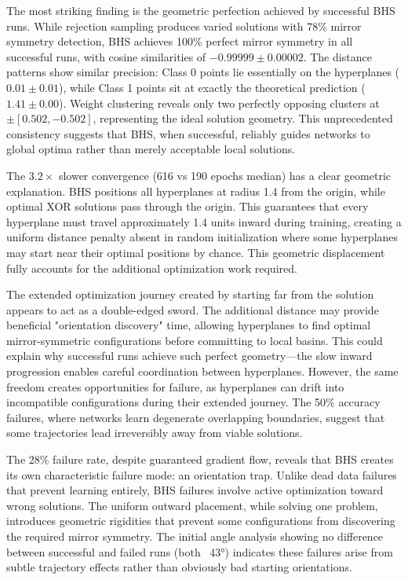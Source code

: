The most striking finding is the geometric perfection achieved by successful BHS runs. While rejection sampling produces varied solutions with 78\% mirror symmetry detection, BHS achieves 100\% perfect mirror symmetry in all successful runs, with cosine similarities of $-0.99999 \pm 0.00002$. The distance patterns show similar precision: Class 0 points lie essentially on the hyperplanes ($0.01 \pm 0.01$), while Class 1 points sit at exactly the theoretical prediction ($1.41 \pm 0.00$). Weight clustering reveals only two perfectly opposing clusters at $\pm[0.502, -0.502]$, representing the ideal solution geometry. This unprecedented consistency suggests that BHS, when successful, reliably guides networks to global optima rather than merely acceptable local solutions.

The $3.2\times$ slower convergence (616 vs 190 epochs median) has a clear geometric explanation. BHS positions all hyperplanes at radius 1.4 from the origin, while optimal XOR solutions pass through the origin. This guarantees that every hyperplane must travel approximately 1.4 units inward during training, creating a uniform distance penalty absent in random initialization where some hyperplanes may start near their optimal positions by chance. This geometric displacement fully accounts for the additional optimization work required.

The extended optimization journey created by starting far from the solution appears to act as a double-edged sword. The additional distance may provide beneficial "orientation discovery" time, allowing hyperplanes to find optimal mirror-symmetric configurations before committing to local basins. This could explain why successful runs achieve such perfect geometry—the slow inward progression enables careful coordination between hyperplanes. However, the same freedom creates opportunities for failure, as hyperplanes can drift into incompatible configurations during their extended journey. The 50\% accuracy failures, where networks learn degenerate overlapping boundaries, suggest that some trajectories lead irreversibly away from viable solutions.

The 28\% failure rate, despite guaranteed gradient flow, reveals that BHS creates its own characteristic failure mode: an orientation trap. Unlike dead data failures that prevent learning entirely, BHS failures involve active optimization toward wrong solutions. The uniform outward placement, while solving one problem, introduces geometric rigidities that prevent some configurations from discovering the required mirror symmetry. The initial angle analysis showing no difference between successful and failed runs (both ~43°) indicates these failures arise from subtle trajectory effects rather than obviously bad starting orientations.


